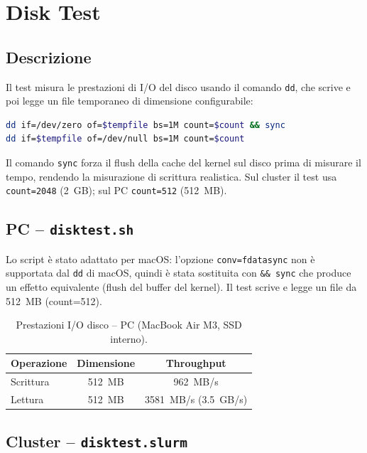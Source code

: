 \documentclass[a4paper,12pt]{article}
\begin{document}
\section{Disk Test}

\subsection{Descrizione}

Il test misura le prestazioni di I/O del disco usando il comando \texttt{dd}, che scrive e poi legge un file temporaneo di dimensione configurabile:

\begin{lstlisting}[language=bash]
dd if=/dev/zero of=$tempfile bs=1M count=$count && sync
dd if=$tempfile of=/dev/null bs=1M count=$count
\end{lstlisting}

Il comando \texttt{sync} forza il flush della cache del kernel sul disco prima di misurare il tempo, rendendo la misurazione di scrittura realistica. Sul cluster il test usa \texttt{count=2048} (2~GB); sul PC \texttt{count=512} (512~MB).

\subsection{PC -- \texttt{disktest.sh}}

Lo script \`e stato adattato per macOS: l'opzione \texttt{conv=fdatasync} non \`e supportata dal \texttt{dd} di macOS, quindi \`e stata sostituita con \texttt{\&\& sync} che produce un effetto equivalente (flush del buffer del kernel). Il test scrive e legge un file da 512~MB (count=512).

\begin{table}[H]
\centering
\begin{tabular}{lcc}
\toprule
\textbf{Operazione} & \textbf{Dimensione} & \textbf{Throughput} \\
\midrule
Scrittura & 512~MB & 962~MB/s \\
Lettura   & 512~MB & 3581~MB/s (3.5~GB/s) \\
\bottomrule
\end{tabular}
\caption{Prestazioni I/O disco -- PC (MacBook Air M3, SSD interno).}
\end{table}

\subsection{Cluster -- \texttt{disktest.slurm}}
\end{document}
